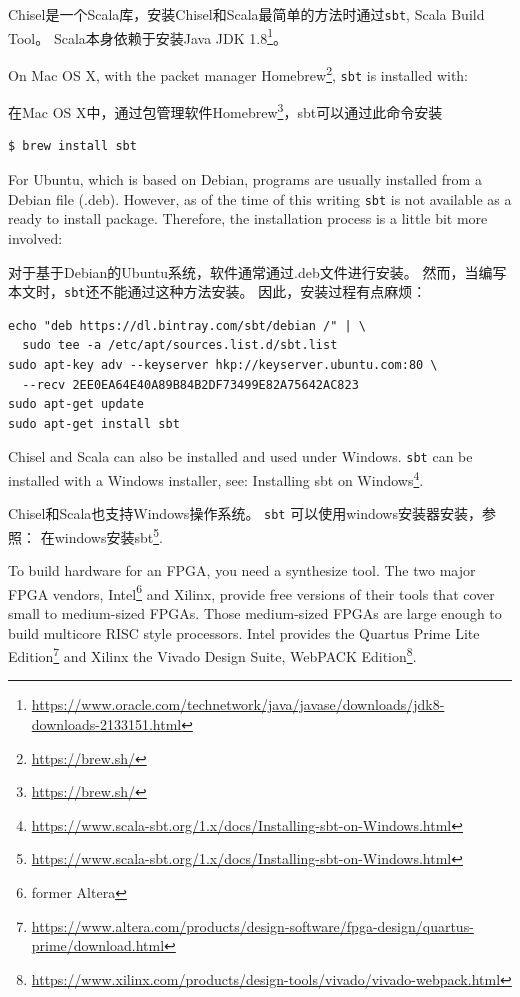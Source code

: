 \documentclass[%
    10pt,
    headinclude, footexclude,
    openright, %
    notitlepage,
    cleardoubleempty,
    headsepline,
    pointlessnumbers,
    bibtotoc, idxtotoc,
    ]{scrbook}
\newcommand{\code}[1]{{\small{\texttt{#1}}}}
\newcommand{\myref}[2]{\href{#1}{#2}}
\renewcommand{\myref}[2]{{#2}{\footnote{\url{#1}}}}
\begin{document}
Chisel是一个Scala库，安装Chisel和Scala最简单的方法时通过\code{sbt}, Scala Build Tool。
Scala本身依赖于安装\myref{https://www.oracle.com/technetwork/java/javase/downloads/jdk8-downloads-2133151.html}{Java JDK 1.8}。

On Mac OS X, with the packet manager \myref{https://brew.sh/}{Homebrew},
\code{sbt} is installed with:

在Mac OS X中，通过包管理软件\myref{https://brew.sh/}{Homebrew}，sbt可以通过此命令安装

\begin{verbatim}
$ brew install sbt
\end{verbatim}

\noindent For Ubuntu, which is based on Debian, programs are usually installed from a
Debian file (.deb). However, as of the time of this writing \code{sbt} is not
available as a ready to install package. Therefore, the installation process
is a little bit more involved:

对于基于Debian的Ubuntu系统，软件通常通过.deb文件进行安装。
然而，当编写本文时，\code{sbt}还不能通过这种方法安装。
因此，安装过程有点麻烦：

\begin{verbatim}
echo "deb https://dl.bintray.com/sbt/debian /" | \
  sudo tee -a /etc/apt/sources.list.d/sbt.list
sudo apt-key adv --keyserver hkp://keyserver.ubuntu.com:80 \
  --recv 2EE0EA64E40A89B84B2DF73499E82A75642AC823
sudo apt-get update
sudo apt-get install sbt
\end{verbatim}

Chisel and Scala can also be installed and used under Windows.
\code{sbt} can be installed with a Windows installer, see:
\myref{https://www.scala-sbt.org/1.x/docs/Installing-sbt-on-Windows.html}{Installing sbt on Windows}.

Chisel和Scala也支持Windows操作系统。
\code{sbt} 可以使用windows安装器安装，参照：
\myref{https://www.scala-sbt.org/1.x/docs/Installing-sbt-on-Windows.html}{在windows安装sbt}.

To build hardware for an FPGA, you need a synthesize tool. The two major
FPGA vendors, Intel\footnote{former Altera} and Xilinx, provide free versions of
their tools that cover small to medium-sized FPGAs. Those medium-sized
FPGAs are large enough to build multicore RISC style processors.
Intel provides the \myref{https://www.altera.com/products/design-software/fpga-design/quartus-prime/download.html}{Quartus Prime Lite Edition} and Xilinx the
\myref{https://www.xilinx.com/products/design-tools/vivado/vivado-webpack.html}{Vivado Design Suite, WebPACK Edition}.
\end{document}
